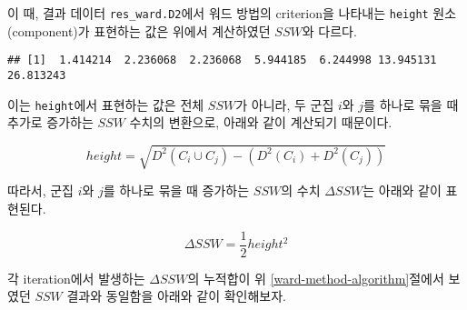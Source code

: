 \documentclass[]{book}
\newenvironment{Shaded}{\begin{snugshade}}{\end{snugshade}}
\newcommand{\NormalTok}[1]{#1}
\newcommand{\OperatorTok}[1]{\textcolor[rgb]{0.81,0.36,0.00}{\textbf{#1}}}
\begin{document}
이 때, 결과 데이터 \texttt{res\_ward.D2}에서 워드 방법의 criterion을 나타내는 \texttt{height} 원소(component)가 표현하는 값은 위에서 계산하였던 \(SSW\)와 다르다.

\begin{Shaded}
\end{Shaded}

\begin{verbatim}
## [1]  1.414214  2.236068  2.236068  5.944185  6.244998 13.945131 26.813243
\end{verbatim}

이는 \texttt{height}에서 표현하는 값은 전체 \(SSW\)가 아니라, 두 군집 \(i\)와 \(j\)를 하나로 묶을 때 추가로 증가하는 \(SSW\) 수치의 변환으로, 아래와 같이 계산되기 때문이다.

\begin{equation}
height = \sqrt{D^2(C_i \cup C_j) - \left(D^2(C_i) + D^2(C_j)\right)}
\label{eq:hclust-height}
\end{equation}

따라서, 군집 \(i\)와 \(j\)를 하나로 묶을 때 증가하는 \(SSW\)의 수치 \(\Delta SSW\)는 아래와 같이 표현된다.

\begin{equation}
\Delta SSW = \frac{1}{2} height^2
\end{equation}

각 iteration에서 발생하는 \(\Delta SSW\)의 누적합이 위 \ref{ward-method-algorithm}절에서 보였던 \(SSW\) 결과와 동일함을 아래와 같이 확인해보자.
\end{document}
